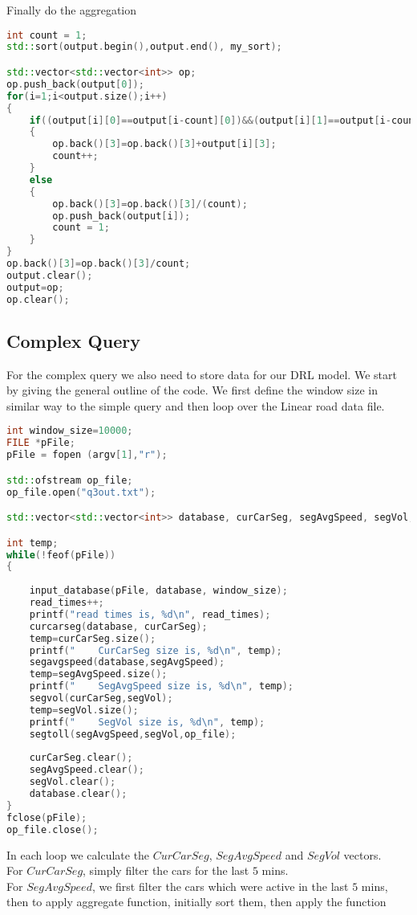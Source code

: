 Finally do the aggregation
\begin{lstlisting}[language=C++]
int count = 1;
std::sort(output.begin(),output.end(), my_sort);

std::vector<std::vector<int>> op;
op.push_back(output[0]);
for(i=1;i<output.size();i++)
{
    if((output[i][0]==output[i-count][0])&&(output[i][1]==output[i-count][1])&&(output[i][2]==output[i-count][2]))
    {
        op.back()[3]=op.back()[3]+output[i][3];
        count++;
    }
    else
    {
        op.back()[3]=op.back()[3]/(count);
        op.push_back(output[i]);
        count = 1;
    }
}
op.back()[3]=op.back()[3]/count;
output.clear();
output=op;
op.clear();
\end{lstlisting}

\subsection{Complex Query}
For the complex query we also need to store data for our DRL model. We start by giving the general outline of the code. We first define the window size in similar way to the simple query and then loop over the Linear road data file.
\begin{lstlisting}[language=C++]
int window_size=10000;
FILE *pFile;
pFile = fopen (argv[1],"r");

std::ofstream op_file;
op_file.open("q3out.txt");

std::vector<std::vector<int>> database, curCarSeg, segAvgSpeed, segVol;

int temp;
while(!feof(pFile))
{
    
    input_database(pFile, database, window_size);
    read_times++;
    printf("read times is, %d\n", read_times);
    curcarseg(database, curCarSeg);
    temp=curCarSeg.size();
    printf("    CurCarSeg size is, %d\n", temp);
    segavgspeed(database,segAvgSpeed);
    temp=segAvgSpeed.size();
    printf("    SegAvgSpeed size is, %d\n", temp);
    segvol(curCarSeg,segVol);
    temp=segVol.size();
    printf("    SegVol size is, %d\n", temp);
    segtoll(segAvgSpeed,segVol,op_file);
    
    curCarSeg.clear();
    segAvgSpeed.clear();
    segVol.clear();
    database.clear();
}
fclose(pFile);
op_file.close();
\end{lstlisting}
In each loop we calculate the $CurCarSeg$, $SegAvgSpeed$ and $SegVol$ vectors.\\
For $CurCarSeg$, simply filter the cars for the last $5$ mins.\\
For $SegAvgSpeed$, we first filter the cars which were active in the last $5$ mins, then to apply aggregate function, initially sort them, then apply the function 
